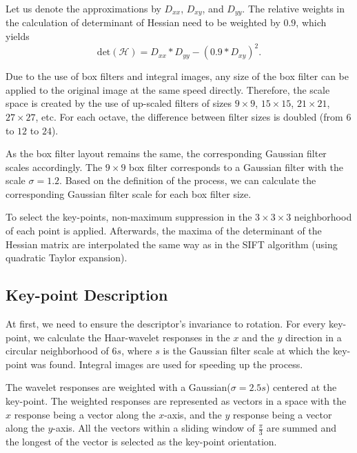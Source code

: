Let us denote the approximations by $D_{xx}$, $D_{xy}$, and $D_{yy}$. The relative weights in the calculation of determinant of Hessian need to be weighted by $0.9$, which yields
\begin{equation}
    \text{det}(\mathcal{H}) = D_{xx} * D_{yy} - (0.9 * D_{xy})^{2}.
\end{equation}

Due to the use of box filters and integral images, any size of the box filter can be applied to the original image at the same speed directly. Therefore, the scale space is created by the use of up-scaled filters of sizes $9\times9$, $15\times15$, $21\times21$, $27\times27$, etc. For each octave, the difference between filter sizes is doubled (from $6$ to $12$ to $24$).

As the box filter layout remains the same, the corresponding Gaussian filter scales accordingly. The $9\times9$ box filter corresponds to a Gaussian filter with the scale $\sigma = 1.2$. Based on the definition of the process, we can calculate the corresponding Gaussian filter scale for each box filter size.

To select the key-points, non-maximum suppression in the $3\times3\times3$ neighborhood of each point is applied. Afterwards, the maxima of the determinant of the Hessian matrix are interpolated the same way as in the SIFT algorithm (using quadratic Taylor expansion).

\subsection{Key-point Description}
At first, we need to ensure the descriptor's invariance to rotation. For every key-point, we calculate the Haar-wavelet responses in the $x$ and the $y$ direction in a circular neighborhood of $6s$, where $s$ is the Gaussian filter scale at which the key-point was found. Integral images are used for speeding up the process.

The wavelet responses are weighted with a Gaussian($\sigma = 2.5 s$) centered at the key-point. The weighted responses are represented as vectors in a space with the $x$ response being a vector along the $x$-axis, and the $y$ response being a vector along the $y$-axis. All the vectors within a sliding window of $\frac{\pi}{3}$ are summed and the longest of the vector is selected as the key-point orientation.

